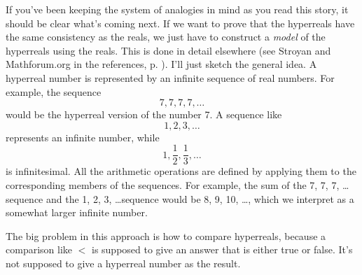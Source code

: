 If you've been keeping the system of analogies in mind as you read this story, it should be clear
what's coming next. If we want to prove that the hyperreals have the same consistency as the
reals, we just have to construct a \emph{model} of the hyperreals using the reals. This is done
in detail elsewhere (see Stroyan and Mathforum.org in the references, p. \pageref{references}).
I'll just sketch
the general idea. A hyperreal number is represented by an infinite sequence of real numbers.
For example, the sequence
\begin{equation*}
  7, 7, 7, 7, \ldots
\end{equation*}
would be the hyperreal version of the number 7.
A sequence like
\begin{equation*}
  1, 2, 3, \ldots
\end{equation*}
represents an infinite number, while
\begin{equation*}
  1, \frac{1}{2}, \frac{1}{3}, \ldots
\end{equation*}
is infinitesimal. All the arithmetic operations are defined by applying them to the corresponding
members of the sequences. For example, the sum of the 7, 7, 7, \ldots sequence and the
1, 2, 3, \ldots sequence would be 8, 9, 10, \ldots, which we interpret as a somewhat larger
infinite number.

The big problem in this approach is how to compare hyperreals, because a comparison like $<$
is supposed to give an answer that is either true or false. It's not supposed to give a hyperreal
number as the result.

